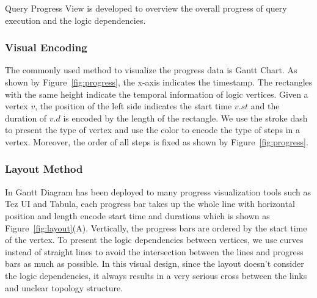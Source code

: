 Query Progress View is developed to overview the overall progress of query execution and the logic dependencies. 

\subsubsection{Visual Encoding}
The commonly used method to visualize the progress data is Gantt Chart.
As shown by Figure~\ref{fig:progress}, the x-axis indicates the timestamp. The rectangles with the same height indicate the temporal information of logic vertices. 
Given a vertex $v$, the position of the left side indicates the start time $v.st$ and the duration of $v.d$ is encoded by the length of the rectangle. We use the stroke dash to present the type of vertex and use the color to encode the type of steps in a vertex. Moreover, the order of all steps is fixed as shown by Figure~\ref{fig:progress}.

\subsubsection{Layout Method}
In Gantt Diagram has been deployed to many progress visualization tools such as Tez UI and Tabula, each progress bar takes up the whole line with horizontal position and length encode start time and durations which is shown as Figure~\ref{fig:layout}(A).
Vertically, the progress bars are ordered by the start time of the vertex. To present the logic dependencies between vertices, we use curves instead of straight lines to avoid the intersection between the lines and progress bars as much as possible. In this visual design, since the layout doesn't consider the logic dependencies, it always results in a very serious cross between the links and unclear topology structure.

